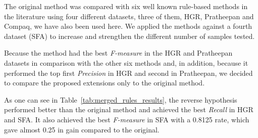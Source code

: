 The original method was compared with six well known rule-based methods in the literature using four different datasets, three of them, HGR, Pratheepan and Compaq, we have also been used here. We applied the methods against a fourth dataset (SFA) to increase and strengthen the different number of samples tested.

Because the method had the best \textit{F-measure} in the HGR and Pratheepan datasets in comparison with the other six methods and, in addition, because it performed the top first \textit{Precision} in HGR and second in Pratheepan, we decided to compare the proposed extensions only to the original method.

As one can see in Table~\ref{tab:merged_rules_results}, the reverse hypothesis performed better than the original method and achieved the best \textit{Recall} in HGR and SFA. It also achieved the best \textit{F-measure} in SFA with a 0.8125 rate, which gave almost 0.25 in gain compared to the original.

